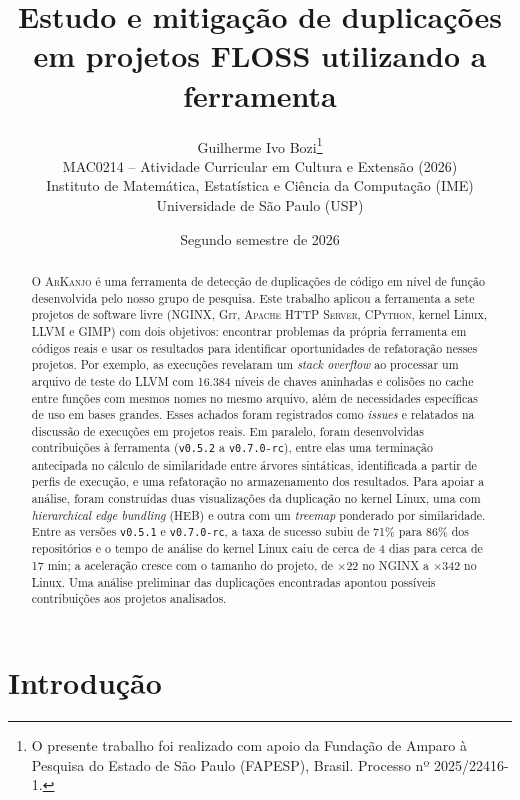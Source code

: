 \documentclass{article}
\title{Estudo e mitigação de duplicações em projetos FLOSS utilizando a ferramenta \ark}
\author{Guilherme Ivo Bozi\thanks{O presente trabalho foi realizado com apoio da Fundação de Amparo à Pesquisa do Estado de São Paulo (FAPESP), Brasil. Processo nº 2025/22416-1.}\\
\small{MAC0214 -- Atividade Curricular em Cultura e Extensão (2026)} \\
\small{Instituto de Matemática, Estatística e Ciência da Computação (IME)} \\
\small{Universidade de São Paulo (USP)}}
\date{Segundo semestre de 2026}
\newcommand{\scene}[2]{\todo[size=\tiny,color=blue!10]{#1 (#2)}}
\newcommand{\ark}{\textsc{ArKanjo}}
\newcommand{\vnova}{\texttt{v0.7.0-rc}}
\begin{document}
\renewcommand{\thefootnote}{\fnsymbol{footnote}}
\setcounter{footnote}{1}

\maketitle

\renewcommand{\thefootnote}{\arabic{footnote}}
\setcounter{footnote}{0}

\begin{abstract}
O \ark{} é uma ferramenta de detecção de duplicações de código em nível de função desenvolvida pelo nosso grupo de pesquisa. Este trabalho aplicou a ferramenta a sete projetos de software livre (\textsc{NGINX}, \textsc{Git}, \textsc{Apache HTTP Server}, \textsc{CPython}, kernel Linux, \textsc{LLVM} e \textsc{GIMP}) com dois objetivos: encontrar problemas da própria ferramenta em códigos reais e usar os resultados para identificar oportunidades de refatoração nesses projetos. Por exemplo, as execuções revelaram um \emph{stack overflow} ao processar um arquivo de teste do \textsc{LLVM} com 16.384 níveis de chaves aninhadas e colisões no cache entre funções com mesmos nomes no mesmo arquivo, além de necessidades específicas de uso em bases grandes. Esses achados foram registrados como \textit{issues} e relatados na discussão de execuções em projetos reais. Em paralelo, foram desenvolvidas contribuições à ferramenta (\texttt{v0.5.2} a \vnova{}), entre elas uma terminação antecipada no cálculo de similaridade entre árvores sintáticas, identificada a partir de perfis de execução, e uma refatoração no armazenamento dos resultados. Para apoiar a análise, foram construídas duas visualizações da duplicação no kernel Linux, uma com \textit{hierarchical edge bundling} (HEB) e outra com um \textit{treemap} ponderado por similaridade. Entre as versões \texttt{v0.5.1} e \vnova{}, a taxa de sucesso subiu de 71\% para 86\% dos repositórios e o tempo de análise do kernel Linux caiu de cerca de 4 dias para cerca de 17 min; a aceleração cresce com o tamanho do projeto, de $\times$22 no \textsc{NGINX} a $\times$342 no Linux. Uma análise preliminar das duplicações encontradas apontou possíveis contribuições aos projetos analisados.
\end{abstract}

\scene{Scene 0}{0:00--0:20}

\clearpage

\section{Introdução}
\end{document}
